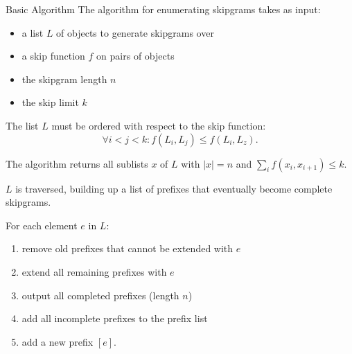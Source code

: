 \documentclass[final]{beamer}
\newcommand*{\pianoroll}{
  \draw (0,2) rectangle (1,2.4);
  \draw (1,2.4) rectangle (2,2.8);
  \draw (2,2) rectangle (2.5,2.4);
  \draw (2.5,1.6) rectangle (3,2);
  \draw (3,1.2) rectangle (3.5,1.6);
  \draw (3.5,0.8) rectangle (4,1.2);
  
  \draw (4,1.6) rectangle (5,2);
  \draw (5,2) rectangle (6,2.4);
  \draw (6,1.6) rectangle (6.5,2);
  \draw (6.5,1.2) rectangle (7,1.6);
  \draw (7,0.8) rectangle (7.5,1.2);
  \draw (7.5,0.4) rectangle (8,0.8);
  
  \draw (1,-0.4) rectangle (2,0);
  \draw (2,0) rectangle (4,0.4);
  \draw (5,-0.8) rectangle (6,-0.4);
  \draw (6,-0.4) rectangle (8,0);
}
\begin{document}
\begin{frame}[t]
\begin{columns}[t]
    \begin{column}{0.3\textwidth}
      \begin{block}{Basic Algorithm}
        The algorithm for enumerating skipgrams takes as input:

        \begin{itemize}
        \item a list $L$ of objects to generate skipgrams over
        \item a skip function $f$ on pairs of objects
        \item the skipgram length $n$
        \item the skip limit $k$
        \end{itemize}

        The list $L$ must be ordered with respect to the skip function:
        \[\forall i < j < k: f(L_i,L_j) \leq f(L_i,L_z).\]
        
        The algorithm returns all sublists $x$ of $L$ with $|x| = n$ and
        $\sum_i f(x_i,x_{i+1}) \leq k$.

        $L$ is traversed, building up a \alert{list of prefixes}
        that eventually become complete skipgrams.

        For each element $e$ in $L$:
        \begin{enumerate}
        \item remove old prefixes that cannot be extended with $e$
        \item extend all remaining prefixes with $e$%
          \item output all completed prefixes (length $n$)
          \item add all incomplete prefixes to the prefix list
        \item add a new prefix $[e]$.
        \end{enumerate}

        \begin{adjustbox}{scale=2,center,margin=0 1ex}
\end{adjustbox}
\end{block}
\end{column}
\end{columns}
\end{frame}
\end{document}
